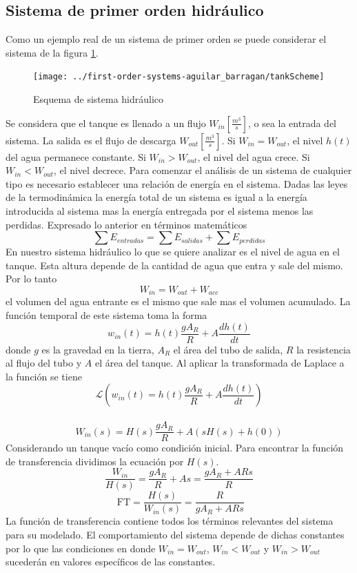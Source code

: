 \documentclass[letterpaper,11pt]{article}
\begin{document}
	\subsection{Sistema de primer orden hidráulico}
	
	Como un ejemplo real de un sistema de primer orden se puede considerar el sistema de la figura \ref{fig:tankScheme}.
	\begin{figure}
	\centering
	\texttt{[image: ../first-order-systems-aguilar\_barragan/tankScheme]}
	\caption{Esquema de sistema hidráulico}
	\label{fig:tankScheme}
	\end{figure}
	Se considera que el tanque es llenado a un flujo $W_{in} [\frac{m^3}{s}]$, o sea la entrada del sistema. La salida es el flujo de descarga $W_{out} [\frac{m^3}{s}]$. Si $W_{in} = W_{out}$, el nivel $h(t)$ del agua permanece constante. Si $W_{in} > W_{out}$, el nivel del agua crece. Si $W_{in} < W_{out}$, el nivel decrece.
	Para comenzar el análisis de un sistema de cualquier tipo es necesario establecer una relación de energía en el sistema. Dadas las leyes de la termodinámica la energía total de un sistema es igual a la energía introducida al sistema mas la energía entregada por el sistema menos las perdidas. Expresado lo anterior en términos matemáticos
	\[\sum E_{entradas} = \sum E_{salidas} + \sum E_{perdidas}\]
	En nuestro sistema hidráulico lo que se quiere analizar es el nivel de agua en el tanque. Esta altura depende de la cantidad de agua que entra y sale del mismo. Por lo tanto
	\[W_{in} = W_{out} + W_{acc}\]
	el volumen del agua entrante es el mismo que sale mas el volumen acumulado.
	La función temporal de este sistema toma la forma
	\[w_{in}(t) = h(t)\frac{gA_R}{R}+A\frac{dh(t)}{dt}\]
	donde $g$ es la gravedad en la tierra, $A_R$ el área del tubo de salida, $R$ la resistencia al flujo del tubo y $A$ el área del tanque. Al aplicar la transformada de Laplace a la función se tiene
	\[ \mathscr{L}\left( w_{in}(t) = h(t)\frac{gA_R}{R}+A\frac{dh(t)}{dt} \right) \]\\
	\[ W_{in}(s) = H(s) \frac{gA_R}{R} + A\left( sH(s) + h(0) \right)\]
	Considerando un tanque vacío como condición inicial. Para encontrar la función de transferencia dividimos la ecuación por $H(s)$.
	\[ \frac{W_{in}}{H(s)} =\frac{g A_R}{R} +As = \frac{g A_R+ARs}{R} \]
	\[\text{ FT} = \frac{H(s)}{W_{in}(s)} = \frac{R}{g A_R+ARs} \]
	La función de transferencia contiene todos los términos relevantes del sistema para su modelado. El comportamiento del sistema depende de dichas constantes por lo que las condiciones en donde $W_{in} = W_{out}$, $W_{in} < W_{out}$ y $W_{in} > W_{out}$ sucederán en valores específicos de las constantes.
\end{document}
